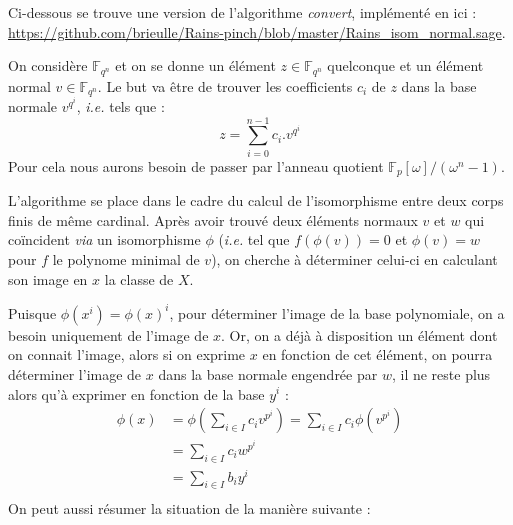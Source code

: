 \documentclass[a4paper]{article} %
\numberwithin{equation}{section}
\newcommand\GF[1]{\mathbb{F}_{#1}}
\begin{document}
\newtheorem{thm}{Thèorème}
\newtheorem{lem}[thm]{Lemme}
\newtheorem{cor}{Corollaire}
\newtheorem{prop}[thm]{Proposition}
\theoremstyle{definition}
\newtheorem*{defn}{Définition}
\newtheorem*{ex}{Exemple}
\theoremstyle{remark}
\newtheorem*{rem}{Remarque}
Ci-dessous se trouve une version de l'algorithme \textit{convert}, implémenté en  ici : \url{https://github.com/brieulle/Rains-pinch/blob/master/Rains\_isom\_normal.sage}.\\\par
On considère $\GF{q^n}$ et on se donne un élément $z\in\GF{q^n}$ quelconque et un élément normal $v\in\GF{q^n}$. Le but va être de trouver les coefficients $c_i$ de $z$ dans la base normale $v^{q^i}$, \textit{i.e.} tels que :
\[z = \sum_{i=0}^{n-1}{c_i.v^{q^i}}\]
Pour cela nous aurons besoin de passer par l'anneau quotient $\mathbb{F}_p[\omega]/(\omega^n - 1)$.\\\par
L'algorithme se place dans le cadre du calcul de l'isomorphisme entre deux corps finis de même cardinal. Après avoir trouvé deux éléments normaux $v$ et $w$ qui coïncident \textit{via} un isomorphisme $\phi$ (\textit{i.e.} tel que $f(\phi(v)) = 0$ et $\phi(v) = w$ pour $f$ le polynome minimal de $v$), on cherche à déterminer celui-ci en calculant son image en $x$ la classe de $X$.\par

Puisque $\phi(x^i) = \phi(x)^i$, pour déterminer l'image de la base polynomiale, on a besoin uniquement de l'image de $x$. Or, on a déjà à disposition un élément dont on connait l'image, alors si on exprime $x$ en fonction de cet élément, on pourra déterminer l'image de $x$ dans la base normale engendrée par $w$, il ne reste plus alors qu'à exprimer en fonction de la base $y^i$ :
\begin{align*}
\phi(x) &= \phi(\sum_{i\in I}{c_iv^{p^i}})= \sum_{i\in I}{c_i\phi(v^{p^i})}\\
&= \sum_{i\in I}{c_iw^{p^i}}\\
&= \sum_{i\in I}{b_iy^i}\\
\end{align*}
On peut aussi résumer la situation de la manière suivante :
\end{document}
